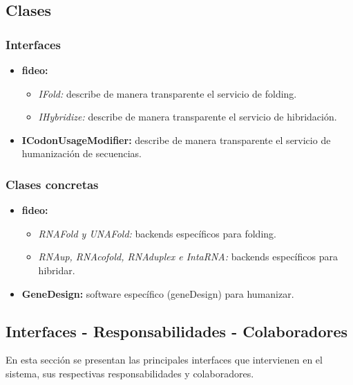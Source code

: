 \documentclass[12pt,a4paper,spanish]{article}
\begin{document}
\subsection{Clases}
\subsubsection{Interfaces}
\begin{itemize}
    \item \textbf{fideo:}
        \begin{itemize}
            \item \emph{IFold:} describe de manera transparente el servicio de folding.
            \item \emph{IHybridize:} describe de manera transparente el servicio de hibridación.
        \end{itemize}
    \item \textbf{ICodonUsageModifier:} describe de manera transparente el servicio de humanización de
                                        secuencias.
\end{itemize}

\subsubsection{Clases concretas}
\begin{itemize}
    \item \textbf{fideo:}
        \begin{itemize}
            \item \emph{RNAFold y UNAFold:} backends específicos para folding.
            \item \emph{RNAup, RNAcofold, RNAduplex e IntaRNA:} backends específicos para hibridar.
        \end{itemize}
    \item \textbf{GeneDesign:} software específico (geneDesign) para humanizar.
\end{itemize}

\subsection{Interfaces - Responsabilidades - Colaboradores}
En esta sección se presentan las principales interfaces que intervienen en el sistema, sus respectivas responsabilidades y colaboradores. 
\end{document}
